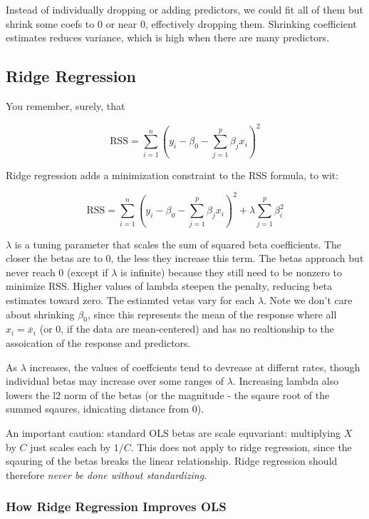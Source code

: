 \documentclass[
]{article}
\begin{document}
Instead of individually dropping or adding predictors, we could fit all
of them but shrink some coefs to 0 or near 0, effectively dropping them.
Shrinking coefficient estimates reduces variance, which is high when
there are many predictors.

\hypertarget{ridge-regression}{%
\subsection{Ridge Regression}\label{ridge-regression}}

You remember, surely, that

\[\text{RSS}=\sum^n_{i=1}(y_i-\beta_0-\sum^p_{j=1}\beta_jx_i)^2\]

Ridge regression adds a minimization constraint to the RSS formula, to
wit:

\[\text{RSS}=\sum^n_{i=1}(y_i-\beta_0-\sum^p_{j=1}\beta_jx_i)^2 +\lambda\sum^p_{j=1}\beta^2_i\]

\(\lambda\) is a tuning parameter that scales the sum of squared beta
coefficients. The closer the betas are to 0, the less they increase this
term. The betas approach but never reach 0 (except if \(\lambda\) is
infinite) because they still need to be nonzero to minimize RSS. Higher
values of lambda steepen the penalty, reducing beta estimates toward
zero. The estiamted vetas vary for each \(\lambda\). Note we don't care
about shrinking \(\beta_0\), since this represents the mean of the
response where all \(x_i=\overline{x}_i\) (or 0, if the data are
mean-centered) and has no realtionship to the assoication of the
response and predictors.

As \(\lambda\) increases, the values of coeffcients tend to devrease at
differnt rates, though individual betas may increase over some ranges of
\(\lambda\). Increasing lambda also lowers the l2 norm of the betas (or
the magnitude - the sqaure root of the summed sqaures, idnicating
distance from 0).

An important caution: standard OLS betas are scale equvariant:
multiplying \(X\) by \(C\) just scales each by \(1/C\). This does not
apply to ridge regression, since the sqauring of the betas breaks the
linear relationship. Ridge regression should therefore \emph{never be
done without standardizing}.

\hypertarget{how-ridge-regression-improves-ols}{%
\subsubsection{How Ridge Regression Improves
OLS}\label{how-ridge-regression-improves-ols}}
\end{document}
